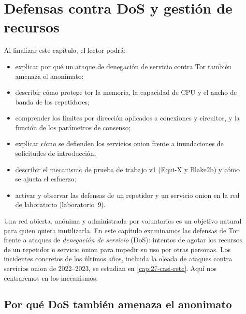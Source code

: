 \chapter{Defensas contra DoS y gestión de recursos}\label{cap:15-dos}

\begin{obiettivi}
Al finalizar este capítulo, el lector podrá:
\begin{itemize}[nosep]
  \item explicar por qué un ataque de denegación de servicio contra Tor también amenaza el anonimato;
  \item describir cómo protege tor la memoria, la capacidad de CPU y el ancho de banda de los repetidores;
  \item comprender los límites por dirección aplicados a conexiones y circuitos, y la función de los parámetros de consenso;
  \item explicar cómo se defienden los servicios onion frente a inundaciones de solicitudes de introducción;
  \item describir el mecanismo de prueba de trabajo v1 (Equi-X y Blake2b) y cómo se ajusta el esfuerzo;
  \item activar y observar las defensas de un repetidor y un servicio onion en la red de laboratorio (laboratorio~9).
\end{itemize}
\end{obiettivi}

Una red abierta, anónima y administrada por voluntarios es un objetivo natural para quien quiera inutilizarla. En este capítulo examinamos las defensas de Tor frente a ataques de \emph{denegación de servicio} (DoS): intentos de agotar los recursos de un repetidor o servicio onion para impedir su uso por otras personas. Los incidentes concretos de los últimos años, incluida la oleada de ataques contra servicios onion de 2022--2023, se estudian en \cref{cap:27-casi-rete}. Aquí nos centraremos en los mecanismos.

\section{Por qué DoS también amenaza el anonimato}\label{sec:dos-anonimato}

